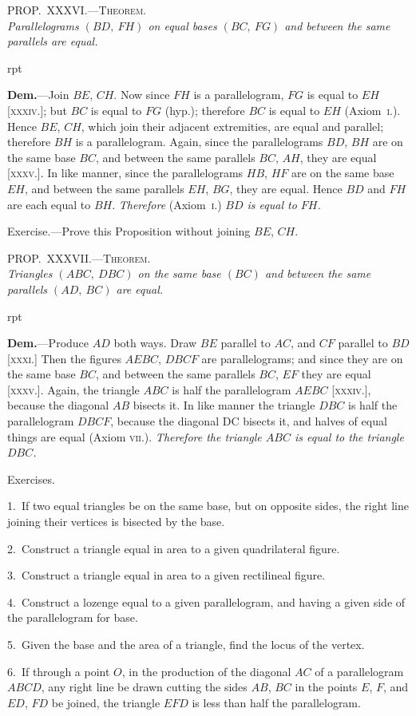 \documentclass[oneside]{book}
\newcommand\myprop[2]{
\bigskip\Needspace*{4\baselineskip}\begin{center}\textsc{#1}\\\medskip\emph{#2}\par\end{center}
}
\newcommand\exhead[1]{
\Needspace*{5\baselineskip}\begin{center}
\textsf{#1}
\end{center}
}
\newcommand\imgflow[3]{
\setcounter{wrapwidth}{#1}
\begin{wrapfigure}[#2]{r}{\value{wrapwidth}pt}
\begin{center}
\vspace{-0.3in}
\end{center}
\end{wrapfigure}
}
\begin{document}
\myprop{PROP\@.~XXXVI\@.---Theorem.}{Parallelograms $(BD,\ FH)$ on equal bases $(BC,\ FG)$ and
between the same parallels are equal.}

\imgflow{190}{8}{f057}

\textbf{Dem.}---Join $BE$, $CH$. Now since $FH$ is a parallelogram,
$FG$ is equal
to $EH$ [\textsc{xxxiv}.]; but
$BC$ is equal to $FG$
(hyp.); therefore
$BC$ is equal to $EH$
(Axiom~\textsc{i}.). Hence
$BE$, $CH$, which join
their adjacent extremities,
are equal and parallel; therefore $BH$ is a
parallelogram. Again, since the parallelograms $BD$,
$BH$ are on the same base $BC$, and between the same
parallels $BC$, $AH$, they are equal [\textsc{xxxv}.]. In like
manner, since the parallelograms $HB$, $HF$ are on the
same base $EH$, and between the same parallels $EH$,
$BG$, they are equal. Hence $BD$ and $FH$ are each equal
to $BH$. \emph{Therefore} (Axiom~\textsc{i}.) \emph{$BD$ is equal to $FH$.}

\begin{footnotesize}
\textsf{Exercise}.---Prove this Proposition without joining $BE$, $CH$.
\par\end{footnotesize}


\myprop{PROP\@.~XXXVII\@.---Theorem.}{Triangles $(ABC,\ DBC)$ on the same base $(BC)$ and between
the same parallels $(AD,\ BC)$ are equal.}

\imgflow{190}{8}{f058}

\textbf{Dem.}---Produce $AD$ both ways. Draw $BE$ parallel
to $AC$, and $CF$ parallel
to $BD$ [\textsc{xxxi}.]
Then the figures
$AEBC$, $DBCF$ are
parallelograms; and
since they are on
the same base $BC$,
and between the
same parallels $BC$, $EF$ they are equal [\textsc{xxxv}.]. Again,
the triangle $ABC$ is half the parallelogram $AEBC$
[\textsc{xxxiv}.], because the diagonal $AB$ bisects it. In like
manner the triangle $DBC$ is half the parallelogram
$DBCF$, because the diagonal DC bisects it, and halves
of equal things are equal (Axiom \textsc{vii}.). \emph{Therefore the
triangle $ABC$ is equal to the triangle $DBC$.}

\exhead{Exercises.}

\begin{footnotesize}
1.~If two equal triangles be on the same base, but on opposite
sides, the right line joining their vertices is bisected by the base.

2.~Construct a triangle equal in area to a given quadrilateral
figure.

3.~Construct a triangle equal in area to a given rectilineal
figure.

4.~Construct a lozenge equal to a given parallelogram, and
having a given side of the parallelogram for base.

5.~Given the base and the area of a triangle, find the locus of
the vertex.

6.~If through a point $O$, in the production of the diagonal $AC$
of a parallelogram $ABCD$, any right line be drawn cutting the
sides $AB$, $BC$ in the points $E$, $F$, and $ED$, $FD$ be joined, the
triangle $EFD$ is less than half the parallelogram.
\par\end{footnotesize}
\end{document}
